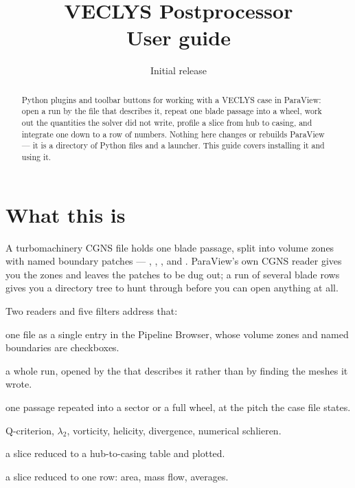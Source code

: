\documentclass[11pt,a4paper]{article}
\title{\textbf{VECLYS Postprocessor}\\[2mm]
  \large User guide}
\author{}
\date{Initial release}
\begin{document}
\maketitle

\begin{abstract}
\noindent
Python plugins and toolbar buttons for working with a VECLYS case in ParaView:
open a run by the file that describes it, repeat one blade passage into a wheel,
work out the quantities the solver did not write, profile a slice from hub to
casing, and integrate one down to a row of numbers. Nothing here changes or
rebuilds ParaView --- it is a directory of Python files and a launcher. This
guide covers installing it and using it.
\end{abstract}

\setcounter{tocdepth}{1}
\tableofcontents
\clearpage

\section{What this is}

A turbomachinery CGNS file holds one blade passage, split into volume zones with
named boundary patches --- , , ,
 and . ParaView's own CGNS reader gives you the zones and
leaves the patches to be dug out; a run of several blade rows gives you a
directory tree to hunt through before you can open anything at all.

Two readers and five filters address that:

\begin{description}[style=nextline,leftmargin=6mm]
  \item[CGNS (labeled boundaries)] one  file as a single entry in
    the Pipeline Browser, whose volume zones and named boundaries are
    checkboxes.
  \item[Veclys Reader] a whole run, opened by the  that
    describes it rather than by finding the meshes it wrote.
  \item[Circumferential Copy, Linear Copy] one passage repeated into a sector or
    a full wheel, at the pitch the case file states.
  \item[Flow Properties] Q-criterion, $\lambda_2$, vorticity, helicity,
    divergence, numerical schlieren.
  \item[Radial Profile] a slice reduced to a hub-to-casing table and plotted.
  \item[Surface Average] a slice reduced to one row: area, mass flow, averages.
\end{description}
\end{document}
